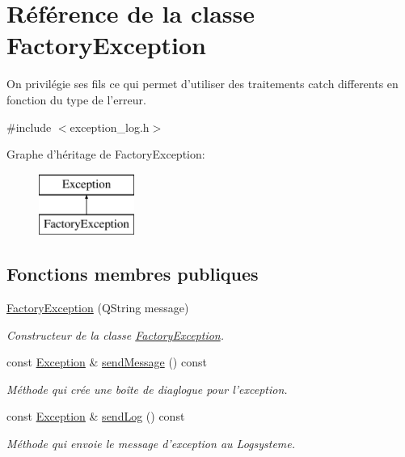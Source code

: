 \hypertarget{class_factory_exception}{\section{Référence de la classe Factory\-Exception}
\label{class_factory_exception}
}


On privilégie ses fils ce qui permet d'utiliser des traitements catch differents en fonction du type de l'erreur.  




{\ttfamily \#include $<$exception\-\_\-log.\-h$>$}

Graphe d'héritage de Factory\-Exception\-:\begin{figure}[H]
\begin{center}
\leavevmode
\includegraphics[height=2.000000cm]{class_factory_exception}
\end{center}
\end{figure}
\subsection*{Fonctions membres publiques}
\begin{DoxyCompactItemize}
\item 
\hyperlink{class_factory_exception_a4cfa20edeb011619ff2e42444a0e8de8}{Factory\-Exception} (Q\-String message)
\begin{DoxyCompactList}\small\item\em Constructeur de la classe \hyperlink{class_factory_exception}{Factory\-Exception}. \end{DoxyCompactList}\item 
\hypertarget{class_factory_exception_ab83319a32911e541798a6b01693c3839}{const \hyperlink{class_exception}{Exception} \& \hyperlink{class_factory_exception_ab83319a32911e541798a6b01693c3839}{send\-Message} () const }\label{class_factory_exception_ab83319a32911e541798a6b01693c3839}

\begin{DoxyCompactList}\small\item\em Méthode qui crée une boîte de diaglogue pour l'exception. \end{DoxyCompactList}\item 
\hypertarget{class_factory_exception_aa295318bdcc5145a99fefe7a4aa3639e}{const \hyperlink{class_exception}{Exception} \& \hyperlink{class_factory_exception_aa295318bdcc5145a99fefe7a4aa3639e}{send\-Log} () const }\label{class_factory_exception_aa295318bdcc5145a99fefe7a4aa3639e}

\begin{DoxyCompactList}\small\item\em Méthode qui envoie le message d'exception au Logsysteme. \end{DoxyCompactList}\end{DoxyCompactItemize}
